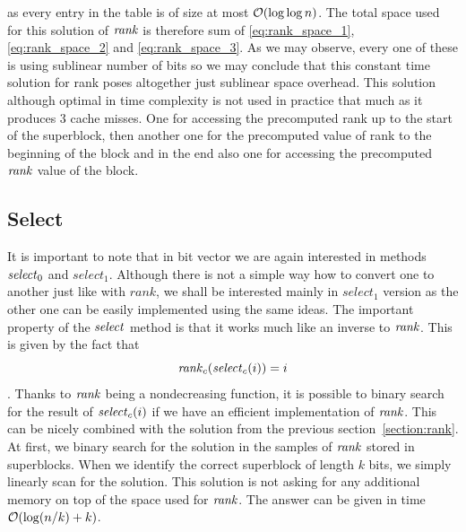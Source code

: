 as every entry in the table is of size at most $\mathcal{O}(\log\log n)$. The total space used for
this solution of $\mathit{rank}$ is therefore sum of \ref{eq:rank_space_1}, \ref{eq:rank_space_2} and
\ref{eq:rank_space_3}. As we may observe, every one of these is using sublinear number of bits so
we may conclude that this constant time solution for rank poses altogether just sublinear space overhead.
This solution although optimal in time complexity is not used in practice that much as it produces
3 cache misses. One for accessing the precomputed rank up to the start of the superblock, then
another one for the precomputed value of rank to the beginning of the block and in the end also one
for accessing the precomputed $\mathit{rank}$ value of the block.


\subsection{Select}
\label{section:select}

It is important to note that in bit vector we are again interested in methods $\mathit{select}_0$
and $select_1$. Although there is not a simple way how to convert one to another just like with
$rank$, we shall be interested mainly in $select_1$ version as the other one can be easily
implemented using the same ideas. The important property of the $\mathit{select}$ method is that it
works much like an inverse to $\mathit{rank}$. This is given by the fact that
                $$\mathit{rank}_c(\mathit{select}_c(i)) = i$$.
Thanks to $\mathit{rank}$ being a nondecreasing function, it is possible to binary search for the result
of $\mathit{select}_c(i)$ if we have an efficient implementation of $\mathit{rank}$. This can be nicely combined
with the solution from the previous section~\ref{section:rank}. At first, we binary search for
the solution in the samples of $\mathit{rank}$ stored in superblocks. When we identify the correct
superblock of length $k$ bits, we simply linearly scan for the solution. This solution is not
asking for any additional memory on top of the space used for $\mathit{rank}$. The answer can be given
in time $\mathcal{O}(\log(n/k)+k)$.

